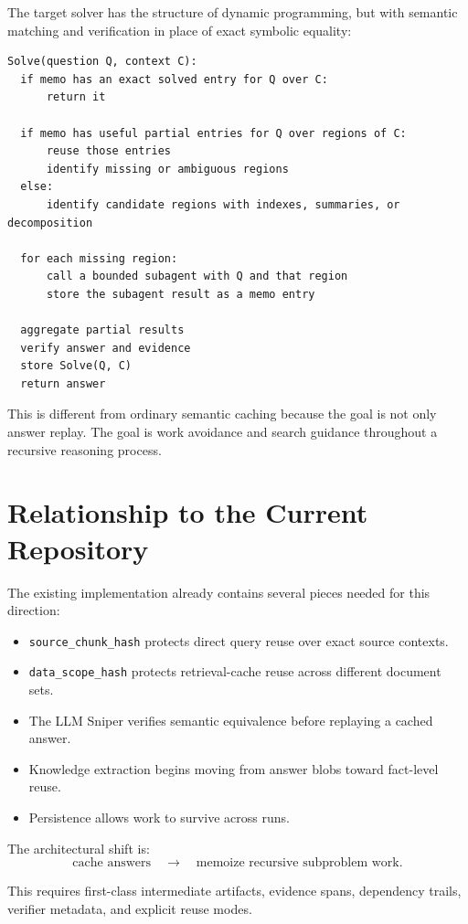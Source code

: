 \documentclass[11pt]{article}
\begin{document}
The target solver has the structure of dynamic programming, but with semantic
matching and verification in place of exact symbolic equality:

\begin{verbatim}
Solve(question Q, context C):
  if memo has an exact solved entry for Q over C:
      return it

  if memo has useful partial entries for Q over regions of C:
      reuse those entries
      identify missing or ambiguous regions
  else:
      identify candidate regions with indexes, summaries, or decomposition

  for each missing region:
      call a bounded subagent with Q and that region
      store the subagent result as a memo entry

  aggregate partial results
  verify answer and evidence
  store Solve(Q, C)
  return answer
\end{verbatim}

This is different from ordinary semantic caching because the goal is not only
answer replay. The goal is work avoidance and search guidance throughout a
recursive reasoning process.

\section{Relationship to the Current Repository}

The existing implementation already contains several pieces needed for this
direction:

\begin{itemize}[leftmargin=*]
    \item \texttt{source\_chunk\_hash} protects direct query reuse over exact
    source contexts.
    \item \texttt{data\_scope\_hash} protects retrieval-cache reuse across
    different document sets.
    \item The LLM Sniper verifies semantic equivalence before replaying a
    cached answer.
    \item Knowledge extraction begins moving from answer blobs toward
    fact-level reuse.
    \item Persistence allows work to survive across runs.
\end{itemize}

The architectural shift is:
\[
    \text{cache answers} \quad \longrightarrow \quad
    \text{memoize recursive subproblem work}.
\]

This requires first-class intermediate artifacts, evidence spans, dependency
trails, verifier metadata, and explicit reuse modes.
\end{document}
